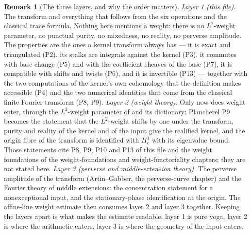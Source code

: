\documentclass[11pt]{article}
\theoremstyle{plain}
\theoremstyle{definition}
\newtheorem{remark}[theorem]{Remark}
\begin{document}
\begin{remark}[The three layers, and why the order matters]
\label{rem:layers}
\emph{Layer 1 (this file).}  The transform and everything that follows from
the six operations and the classical trace formula.  Nothing here mentions a
weight: there is no $L^2$-weight parameter, no punctual purity, no
mixedness, no reality, no perverse amplitude.  The properties are the ones a
kernel transform always has --- it is exact and triangulated (P2), its stalks
are integrals against the kernel (P3), it commutes with base change (P5) and
with the coefficient sheaves of the base (P7), it is compatible with shifts
and twists (P6), and it is invertible (P13) --- together with the two
computations of the kernel's own cohomology that the definition makes
accessible (P4) and the two numerical identities that come from the classical
finite Fourier transform (P8, P9).
\emph{Layer 2 (weight theory).}  Only now does weight enter, through the
$L^2$-weight parameter of  and its dictionary: Plancherel
P9 becomes the statement that the $L^2$-weight shifts by one under the
transform, purity and reality of the kernel and of the input give the
realified kernel, and the origin fibre of the transform is identified with
$H^1_c$ with its eigenvalue bound.  Those statements cite P8, P9, P10 and P13
of this file and the weight foundations of the weight-foundations and weight-functoriality chapters; they are not
stated here.
\emph{Layer 3 (perverse and middle-extension theory).}  The perverse amplitude
of the transform (Artin--Gabber, the perverse-curve chapter) and the Fourier theory of middle
extensions: the concentration statement for a nonexceptional input, and the
stationary-phase identification at the origin.
The affine-line weight estimate then consumes layer 2 and layer 3 together.
Keeping the layers apart is what makes the estimate readable: layer 1 is pure
yoga, layer 2 is where the arithmetic enters, layer 3 is where the geometry of
the input enters.
\end{remark}
\end{document}
